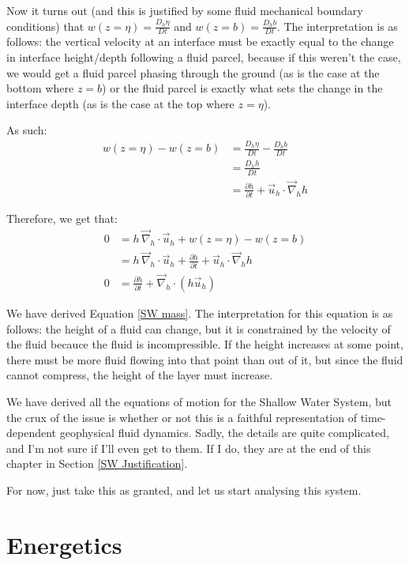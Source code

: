 Now it turns out (and this is justified by some fluid mechanical boundary conditions) that $w(z=\eta)=\frac{D_h \eta}{Dt}$ and $w(z=b)=\frac{D_h b}{Dt}$. The interpretation is as follows: the vertical velocity at an interface must be exactly equal to the change in interface height/depth following a fluid parcel, because if this weren't the case, we would get a fluid parcel phasing through the ground (as is the case at the bottom where $z=b$) or the fluid parcel is exactly what sets the change in the interface depth (as is the case at the top where $z=\eta$).

As such:
\begin{align*}
    w(z=\eta)-w(z=b)&=\frac{D_h \eta}{Dt}-\frac{D_h b}{Dt}\\
    &=\frac{D_h h}{Dt}\\
    &=\frac{\partial h}{\partial t}+ \vec{u}_h\cdot\vec{\nabla}_hh
\end{align*}

Therefore, we get that:
\begin{align*}
    0&=h\,\vec{\nabla}_h\cdot\vec{u}_h + w(z=\eta)-w(z=b)\\
    &=h\,\vec{\nabla}_h\cdot\vec{u}_h+\frac{\partial h}{\partial t}+ \vec{u}_h\cdot\vec{\nabla}_hh\\
    0&=\frac{\partial h}{\partial t}+\vec{\nabla}_h\cdot(h\vec{u}_h)
\end{align*}

We have derived Equation \ref{SW mass}. The interpretation for this equation is as follows: the height of a fluid can change, but it is constrained by the velocity of the fluid becauce the fluid is incompressible. If the height increases at some point, there must be more fluid flowing into that point than out of it, but since the fluid cannot compress, the height of the layer must increase.

We have derived all the equations of motion for the Shallow Water System, but the crux of the issue is whether or not this is a faithful representation of time-dependent geophysical fluid dynamics. Sadly, the details are quite complicated, and I'm not sure if I'll even get to them. If I do, they are at the end of this chapter in Section \ref{SW Justification}.

For now, just take this as granted, and let us start analysing this system.

\section{Energetics}

